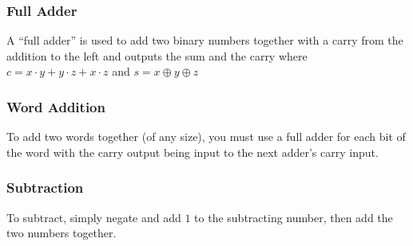\subsubsection{Full Adder}\label{ssub:full_adder}

A ``full adder'' is used to add two binary numbers together with a carry from the addition to the left and outputs the sum and the carry where \(c = x\cdot y + y \cdot z + x\cdot z\) and \(s = x \oplus y \oplus z\)

\subsubsection{Word Addition}\label{ssub:word_addition}

To add two words together (of any size), you must use a full adder for each bit of the word with the carry output being input to the next adder's carry input.

\subsubsection{Subtraction}\label{ssub:subtraction}

To subtract, simply negate and add \(1\) to the subtracting number, then add the two numbers together.
